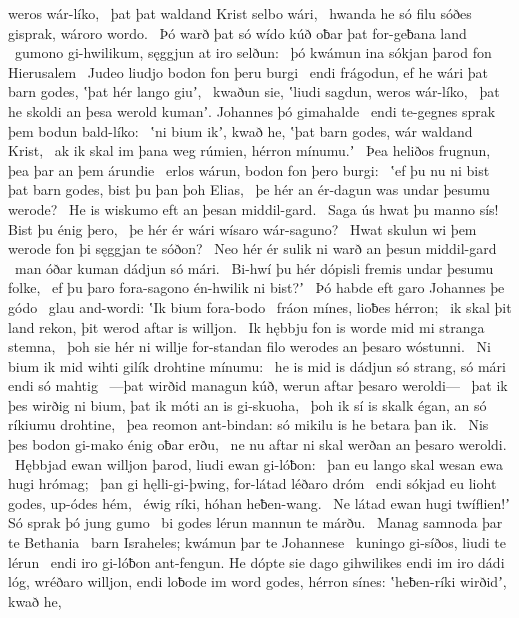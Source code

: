 weros wár-líko, \hld\ þat þat waldand Krist
selbo wári, \hld\ hwanda he só filu sóðes gisprak,
wároro wordo. \hld\ Þó warð þat só wído kúð
oƀar þat for-geƀana land \hld\ gumono gi-hwilikum,
sęggjun at iro selðun: \hld\ þó kwámun ina sókjan þarod
fon Hierusalem \hld\ Judeo liudjo
bodon fon þeru burgi \hld\ endi frágodun, ef he wári þat barn godes,
ʽþat hér lango giuʼ, \hld\ kwaðun sie, ʽliudi sagdun,
weros wár-líko, \hld\ þat he skoldi an þesa werold kumanʼ.
Johannes þó gimahalde \hld\ endi te-gegnes sprak
þem bodun bald-líko: \hld\ ʽni bium ikʼ, kwað he, ʽþat barn godes,
wár waldand Krist, \hld\ ak ik skal im þana weg rúmien,
hérron mínumu.ʼ \hld\ Þea heliðos frugnun,
þea þar an þem árundie \hld\ erlos wárun,
bodon fon þero burgi: \hld\ ʽef þu nu ni bist þat barn godes,
bist þu þan þoh Elias, \hld\ þe hér an ér-dagun
was undar þesumu werode? \hld\ He is wiskumo
eft an þesan middil-gard. \hld\ Saga ús hwat þu manno sís!
Bist þu énig þero, \hld\ þe hér ér wári
wísaro wár-saguno? \hld\ Hwat skulun wi þem werode fon þi
sęggjan te sóðon? \hld\ Neo hér ér sulik ni warð
an þesun middil-gard \hld\ man óðar kuman
dádjun só mári. \hld\ Bi-hwí þu hér dópisli
fremis undar þesumu folke, \hld\ ef þu þaro fora-sagono
én-hwilik ni bist?ʼ \hld\ Þó habde eft garo
Johannes þe gódo \hld\ glau and-wordi:
ʽIk bium fora-bodo \hld\ fráon mínes,
lioƀes hérron; \hld\ ik skal þit land rekon,
þit werod aftar is willjon. \hld\ Ik hębbju fon is worde mid mi
stranga stemna, \hld\ þoh sie hér ni willje for-standan filo
werodes an þesaro wóstunni. \hld\ Ni bium ik mid wihti gilík
drohtine mínumu: \hld\ he is mid is dádjun só strang,
só mári endi só mahtig \hld\ —þat wirðid managun kúð,
werun aftar þesaro weroldi— \hld\ þat ik þes wirðig ni bium,
þat ik móti an is gi-skuoha, \hld\ þoh ik sí is skalk égan,
an só ríkiumu drohtine, \hld\ þea reomon ant-bindan:
só mikilu is he betara þan ik. \hld\ Nis þes bodon gi-mako
énig oƀar erðu, \hld\ ne nu aftar ni skal
werðan an þesaro weroldi. \hld\ Hębbjad ewan willjon þarod,
liudi ewan gi-lóƀon: \hld\ þan eu lango skal
wesan ewa hugi hrómag; \hld\ þan gi hęlli-gi-þwing,
for-látad léðaro dróm \hld\ endi sókjad eu lioht godes,
up-ódes hém, \hld\ éwig ríki,
hóhan heƀen-wang. \hld\ Ne látad ewan hugi twíflien!ʼ
Só sprak þó jung gumo \hld\ bi godes lérun
mannun te márðu. \hld\ Manag samnoda
þar te Bethania \hld\ barn Israheles;
kwámun þar te Johannese \hld\ kuningo gi-síðos,
liudi te lérun \hld\ endi iro gi-lóƀon ant-fengun.
He dópte sie dago gihwilikes endi im iro dádi lóg,
wréðaro willjon, endi loƀode im word godes,
hérron sínes: ʽheƀen-ríki wirðidʼ, kwað he,
